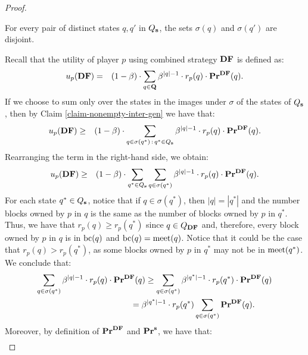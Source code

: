 \begin{proof}
\begin{myclaim}
\label{claim-nonempty-inter-gen}
For every pair of distinct states $q,q'$ in $Q_{\mathbf{s}}$, the sets $\sigma(q)$ and $\sigma(q')$ are disjoint. 
\end{myclaim}

Recall that the utility of player $p$ using combined strategy $\text{\rm {\bf DF}}$ 
is defined as:
\begin{eqnarray*}
u_p(\text{\rm {\bf DF}}) & = & (1-\beta) \cdot \sum_{q \in \mathbf{Q}} \beta^{|q|-1} \cdot r_p(q) \cdot \mathbf{Pr}^{\text{\rm {\bf DF}}}(q).
\end{eqnarray*}
If we choose to sum only over the states in the images under $\sigma$ of the states of $Q_{\mathbf{s}}$, then by Claim \ref{claim-nonempty-inter-gen} we have that:
\begin{eqnarray*}
u_p(\text{\rm {\bf DF}}) & \geq & (1-\beta) \cdot \sum_{q \in \sigma(q^*) \,:\, q^* \in Q_{\mathbf{s}}} \beta^{|q|-1} \cdot r_p(q) \cdot \mathbf{Pr}^{\text{\rm {\bf DF}}}(q).
\end{eqnarray*}
Rearranging the term in the right-hand side, we obtain:
\begin{eqnarray*}
u_p(\text{\rm {\bf DF}}) & \geq &(1-\beta) \cdot \sum_{q^* \in Q_{\mathbf{s}}} \sum_{q \in \sigma(q^*)} \beta^{|q|-1} \cdot r_p(q) \cdot \mathbf{Pr}^{\text{\rm {\bf DF}}}(q).
\end{eqnarray*}
For each state $q^* \in Q_{\mathbf{s}}$, notice that if $q \in \sigma(q^*)$, then $|q| = |q^*|$ and the number blocks owned by $p$ in $q$ is the same as the number of blocks owned by $p$ in $q^*$. Thus, we have that $r_p(q) \geq r_p(q^*)$ since $q \in Q_{\text{\rm {\bf DF}}}$ and, therefore, every block owned by $p$ in $q$ is in $\text{bc}(q)$ and $\text{bc}(q) = \text{\rm meet}(q)$. Notice that it could be the case that $r_p(q) > r_p(q^*)$, as some blocks owned by $p$ in $q^*$ may not be in $\text{\rm meet}(q^*)$. We conclude that:
\begin{align*}
&\hspace{-2pt} \sum_{q \in \sigma(q^*)} \beta^{|q|-1} \cdot r_p(q) \cdot \pr^{\cdf}(q) \geq \sum_{q \in \sigma(q^*)} \beta^{|q^*|-1} \cdot r_p(q^*) \cdot \pr^{\cdf}(q)\\
&\hspace{112pt} = \beta^{|q^*|-1} \cdot r_p(q^*) \sum_{q \in \sigma(q^*)} \pr^{\cdf}(q).
\end{align*}
Moreover, by definition of $\mathbf{Pr}^{\text{\rm {\bf DF}}}$ and $\mathbf{Pr}^{\mathbf{s}}$, we have that:
\begin{eqnarray*}

\end{eqnarray*}
\end{proof}

